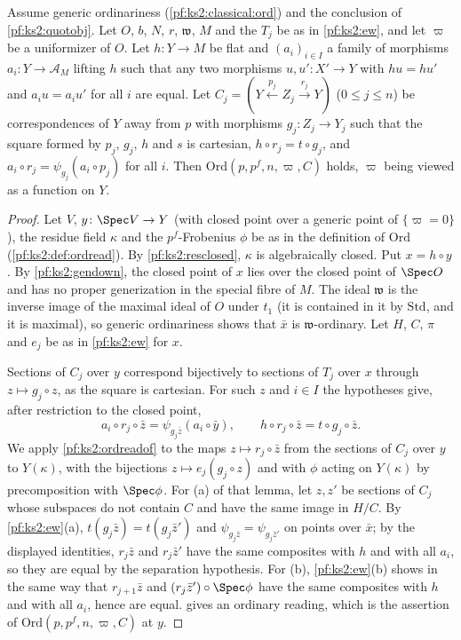 \begin{proposition}\label{pf:ks2:ordemb}
Assume generic ordinariness (\cref{pf:ks2:classical:ord}) and the conclusion of
\cref{pf:ks2:quotobj}. Let $O$, $b$, $N$, $r$, $\mathfrak w$, $M$ and the $T_j$ be as in
\cref{pf:ks2:ew}, and let $\varpi$ be a uniformizer of $O$. Let $h\colon Y\to M$ be flat and
$(a_i)_{i\in I}$ a family of morphisms $a_i\colon Y\to\mathcal A_M$ lifting $h$ such that any two
morphisms $u,u'\colon X'\to Y$ with $hu=hu'$ and $a_iu=a_iu'$ for all $i$ are equal. Let
$C_j=(Y\xleftarrow{p_j}Z_j\xrightarrow{r_j}Y)$ ($0\le j\le n$) be correspondences of $Y$ away from
$p$ with morphisms $g_j\colon Z_j\to Y_j$ such that the square formed by $p_j$, $g_j$, $h$ and $s$ is
cartesian, $h\circ r_j=t\circ g_j$, and $a_i\circ r_j=\psi_{g_j}(a_i\circ p_j)$ for all $i$. Then
$\mathrm{Ord}(p,p^f,n,\varpi,C)$ holds, $\varpi$ being viewed as a function on $Y$.
\end{proposition}

\begin{proof}
Let $V$, $y\colon\Spec V\to Y$ (with closed point over a generic point of $\{\varpi=0\}$), the
residue field $\kappa$ and the $p^f$-Frobenius $\phi$ be as in the definition of $\mathrm{Ord}$
(\cref{pf:ks2:def:ordread}). By \cref{pf:ks2:resclosed}, $\kappa$ is algebraically closed. Put
$x=h\circ y$. By \cref{pf:ks2:gendown}, the closed point of $x$ lies over the closed point of $\Spec
O$ and has no proper generization in the special fibre of $M$. The ideal $\mathfrak w$ is the
inverse image of the maximal ideal of $O$ under $t_1$ (it is contained in it by $\mathrm{Std}$, and
it is maximal), so generic ordinariness shows that $\bar x$ is $\mathfrak w$-ordinary. Let $H$, $C$,
$\pi$ and $e_j$ be as in \cref{pf:ks2:ew} for $x$.

Sections of $C_j$ over $y$ correspond bijectively to sections of $T_j$ over $x$ through $z\mapsto
g_j\circ z$, as the square is cartesian. For such $z$ and $i\in I$ the hypotheses give, after
restriction to the closed point,
\[
a_i\circ r_j\circ\bar z=\psi_{g_j\bar z}(a_i\circ\bar y),\qquad h\circ r_j\circ\bar z=t\circ
g_j\circ\bar z .
\]
We apply \cref{pf:ks2:ordreadof} to the maps $z\mapsto r_j\circ\bar z$ from the sections of $C_j$
over $y$ to $Y(\kappa)$, with the bijections $z\mapsto e_j(g_j\circ z)$ and with $\phi$ acting on
$Y(\kappa)$ by precomposition with $\Spec\phi$. For (a) of that lemma, let $z,z'$ be sections of
$C_j$ whose subspaces do not contain $C$ and have the same image in $H/C$. By \cref{pf:ks2:ew}(a),
$t(g_j\bar z)=t(g_j\bar z')$ and $\psi_{g_j\bar z}=\psi_{g_j\bar z'}$ on points over $\bar x$; by the
displayed identities, $r_j\bar z$ and $r_j\bar z'$ have the same composites with $h$ and with all
$a_i$, so they are equal by the separation hypothesis. For (b), \cref{pf:ks2:ew}(b) shows in the same
way that $r_{j+1}\bar z$ and $(r_j\bar z')\circ\Spec\phi$ have the same composites with $h$ and with
all $a_i$, hence are equal.  gives an ordinary reading, which is the
assertion of $\mathrm{Ord}(p,p^f,n,\varpi,C)$ at $y$.
\end{proof}

